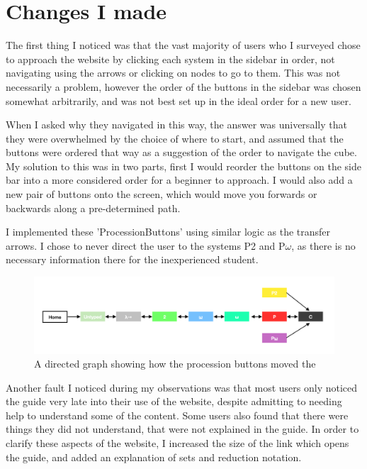 \documentclass{l4proj}
\begin{document}
\section{Changes I made}

The first thing I noticed was that the vast majority of users who I surveyed chose to approach the website by clicking each system in the sidebar in order, not navigating using the arrows or clicking on nodes to go to them.  This was not necessarily a problem, however the order of the buttons in the sidebar was chosen somewhat arbitrarily, and was not best set up in the ideal order for a new user.

When I asked why they navigated in this way, the answer was universally that they were overwhelmed by the choice of where to start, and assumed that the buttons were ordered that way as a suggestion of the order to navigate the cube.  My solution to this was in two parts, first I would reorder the buttons on the side bar into a more considered order for a beginner to approach.  I would also add a new pair of buttons onto the screen, which would move you forwards or backwards along a pre-determined path.

I implemented these 'ProcessionButtons' using similar logic as the transfer arrows.  I chose to never direct the user to the systems P2 and P\underline{$\omega$}, as there is no necessary information there for the inexperienced student.

\begin{figure}[h!]
    \centering
    \includegraphics[width=1\linewidth]{dissertation/images/arrows_graph.png}
    \caption{A directed graph showing how the procession buttons moved the}
    \label{fig:enter-label}
\end{figure}    

Another fault I noticed during my observations was that most users only noticed the guide very late into their use of the website, despite admitting to needing help to understand some of the content.  Some users also found that there were things they did not understand, that were not explained in the guide.  In order to clarify these aspects of the website, I increased the size of the link which opens the guide, and added an explanation of sets and reduction notation.
\end{document}
